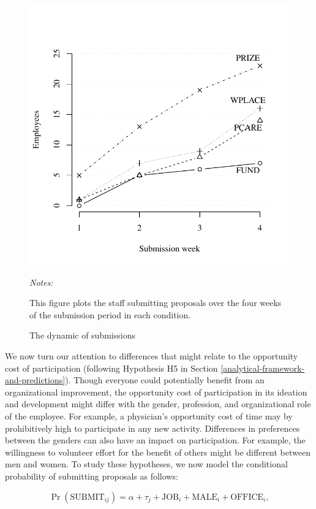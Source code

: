 \documentclass[12pt, titlepage]{article}
\newenvironment{tablenotes}[1][]{
  \begin{minipage}{\textwidth}\emph{Notes:}{\footnotesize #1}
}{\end{minipage}}
\begin{document}
\begin{figure} 
  \centering
  \caption{The dynamic of submissions}
  \label{fig: dynamic}
  \includegraphics{Figures/dynamic-1.pdf}
  \begin{tablenotes}
  This figure plots the staff submitting proposals over the four weeks of the submission period in each condition. 
  \end{tablenotes}
\end{figure}

We now turn our attention to differences that might relate to the
opportunity cost of participation (following Hypothesis H5 in Section
\ref{analytical-framework-and-predictions}). Though everyone could
potentially benefit from an organizational improvement, the opportunity
cost of participation in its ideation and development might differ with
the gender, profession, and organizational role of the employee. For
example, a physician's opportunity cost of time may by prohibitively
high to participate in any new activity. Differences in preferences
between the genders can also have an impact on participation. For
example, the willingness to volunteer effort for the benefit of others
might be different between men and women. To study these hypotheses, we
now model the conditional probability of submitting proposals as
follows:

\begin{equation} 
  \label{eq: submit}
  \Pr(\text{SUBMIT}_{ij}) 
  = \alpha + \tau_{j} + \text{JOB}_{i} + \text{MALE}_{i} + \text{OFFICE}_{i}, 
\end{equation}
\end{document}
